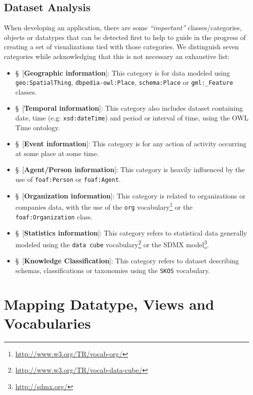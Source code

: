 \subsection{Dataset Analysis}
\label{sec:vizTypes}
When developing an application, there are some \textit{``important''} classes/categories, objects or datatypes that can be detected first to help to guide in the progress of creating a set of visualizations tied with those categories. We distinguish seven categories while acknowledging that this is not necessary an exhaustive list:
\begin{itemize}
 \item{\S~[\textbf{Geographic information}]}: This category is for data modeled using \texttt{geo:SpatialThing}, \texttt{dbpedia-owl:Place}, \texttt{schema:Place} or \texttt{gml:\_Feature} classes.
 \item{\S~[\textbf{Temporal information}]}: This category also includes dataset containing date, time (e.g: \texttt{xsd:dateTime}) and period or interval of time, using the OWL Time ontology.
 \item{\S~[\textbf{Event information}]}: This category is for any action of activity occurring at some place at some time.
 \item{\S~[\textbf{Agent/Person information}]}: This category is heavily influenced by the use of \texttt{foaf:Person} or \texttt{foaf:Agent}.
 \item{\S~[\textbf{Organization information}]}: This category is related to organizations or companies data, with the use of the \texttt{org} vocabulary\footnote{\url{http://www.w3.org/TR/vocab-org/}} or the \texttt{foaf:Organization} class.
 \item{\S~[\textbf{Statistics information}]}: This category refers to statistical data generally modeled using the \texttt{data cube} vocabulary\footnote{\url{http://www.w3.org/TR/vocab-data-cube/}} or the SDMX model\footnote{\url{http://sdmx.org/}}.
 \item{\S~[\textbf{Knowledge Classification}]}: This category refers to dataset describing schemas, classifications or taxonomies using the \texttt{SKOS} vocabulary.
\end{itemize}



\section{Mapping Datatype, Views and Vocabularies}
\label{sec:mapping}

